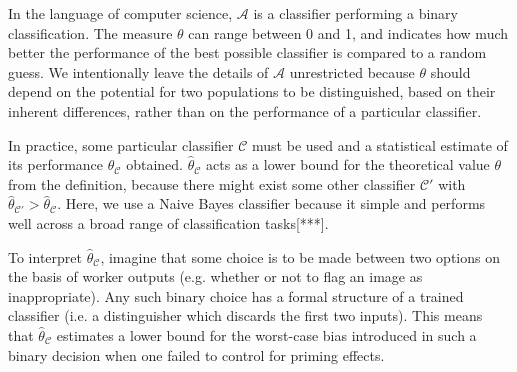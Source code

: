 \documentclass[a4paper]{report}
\begin{document}
In the language of computer science, $\mathcal{A}$ is a classifier performing
a binary classification.  The measure $\theta$ can range between 0 and 1, and 
indicates how much better the performance of the best possible classifier is 
compared to a random guess. We intentionally leave the details of 
$\mathcal{A}$ unrestricted because $\theta$ should depend on the potential 
for two populations to be distinguished, based on their inherent differences, 
rather than on the performance of a particular classifier.

In practice, some particular classifier $\mathcal{C}$ must be used and a 
statistical estimate of its performance $\hat{\theta}_\mathcal{C}$ obtained. 
$\hat{\theta}_\mathcal{C}$ acts as a lower bound for the 
theoretical value $\theta$ from the definition, because there might 
exist some other classifier $\mathcal{C}'$ with 
$\hat{\theta}_\mathcal{C'}>\hat{\theta}_\mathcal{C}$.
Here, we use a Naive Bayes classifier because it simple and performs well 
across a broad range of classification tasks[***].

To interpret $\hat{\theta}_\mathcal{C}$, imagine that some choice is to be
made between two options on the basis of worker outputs (e.g. whether or not 
to flag an image as inappropriate). Any such binary choice has a formal 
structure of a trained classifier (i.e. a distinguisher which discards the 
first two inputs). This means that $\hat{\theta}_\mathcal{C}$ estimates a 
lower bound for the worst-case bias introduced in such a binary decision when 
one failed to control for priming effects.
\end{document}
